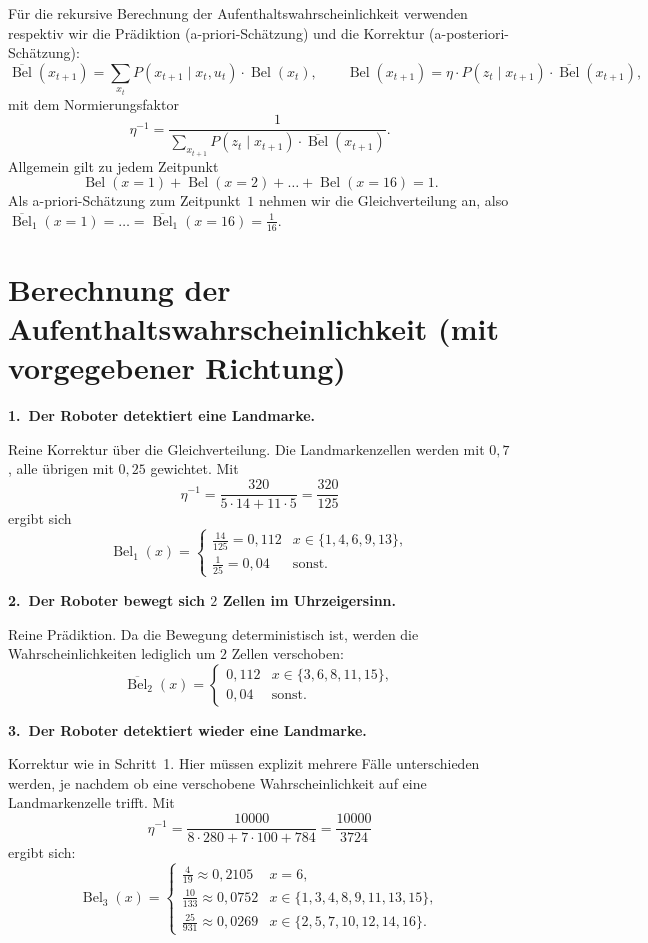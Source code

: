 \documentclass[11pt,a4paper]{article}
\newcommand{\Bel}{\operatorname{Bel}}
\newcommand{\pBel}{\overline{\operatorname{Bel}}}
\begin{document}
Für die rekursive Berechnung der Aufenthaltswahrscheinlichkeit verwenden respektiv wir die
Prädiktion (a-priori-Schätzung) und die Korrektur (a-posteriori-Schätzung):
\[
  \pBel(x_{t+1}) = \sum_{x_t} P(x_{t+1}\mid x_t,u_t)\cdot \Bel(x_t),
  \qquad
  \Bel(x_{t+1}) = \eta\cdot P(z_t\mid x_{t+1})\cdot \pBel(x_{t+1}),
\]
mit dem Normierungsfaktor
\[
  \eta^{-1} = \frac{1}{\sum_{x_{t+1}} P(z_t\mid x_{t+1})\cdot \pBel(x_{t+1})}.
\]
Allgemein gilt zu jedem Zeitpunkt
\[
  \Bel(x=1)+\Bel(x=2)+\dots+\Bel(x=16) = 1.
\]
Als a-priori-Schätzung zum Zeitpunkt~$1$ nehmen wir die Gleichverteilung an, also
$\pBel_1(x=1)=\dots=\pBel_1(x=16)=\tfrac{1}{16}$.

\section*{Berechnung der Aufenthaltswahrscheinlichkeit (mit vorgegebener Richtung)}

\textbf{1.\ Der Roboter detektiert eine Landmarke.}

Reine Korrektur über die Gleichverteilung. Die Landmarkenzellen werden mit $0{,}7$, alle übrigen
mit $0{,}25$ gewichtet. Mit
\[
  \eta^{-1} = \frac{320}{5\cdot 14 + 11\cdot 5} = \frac{320}{125}
\]
ergibt sich
\[
  \Bel_1(x) =
  \begin{cases}
    \tfrac{14}{125}=0{,}112 & x\in\{1,4,6,9,13\},\\[0.3em]
    \tfrac{1}{25}=0{,}04 & \text{sonst.}
  \end{cases}
\]

\textbf{2.\ Der Roboter bewegt sich $2$ Zellen im Uhrzeigersinn.}

Reine Prädiktion. Da die Bewegung deterministisch ist, werden die Wahrscheinlichkeiten lediglich
um $2$ Zellen verschoben:
\[
  \pBel_2(x) =
  \begin{cases}
    0{,}112 & x\in\{3,6,8,11,15\},\\
    0{,}04  & \text{sonst.}
  \end{cases}
\]

\textbf{3.\ Der Roboter detektiert wieder eine Landmarke.}

Korrektur wie in Schritt~1. Hier müssen explizit mehrere Fälle
unterschieden werden, je nachdem ob eine verschobene Wahrscheinlichkeit auf eine Landmarkenzelle
trifft. Mit
\[
  \eta^{-1} = \frac{10000}{8\cdot 280 + 7\cdot 100 + 784} = \frac{10000}{3724}
\]
ergibt sich:
\[
  \Bel_3(x) =
  \begin{cases}
    \tfrac{4}{19}\approx 0{,}2105 & x=6,\\[0.3em]
    \tfrac{10}{133}\approx 0{,}0752 & x\in\{1,3,4,8,9,11,13,15\},\\[0.3em]
    \tfrac{25}{931}\approx 0{,}0269 & x\in\{2,5,7,10,12,14,16\}.
  \end{cases}
\]
\end{document}
